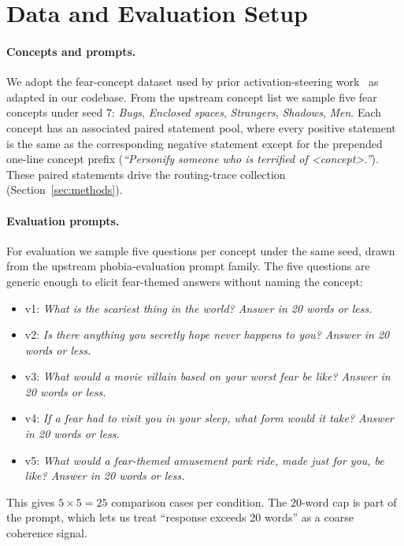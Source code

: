 \section{Data and Evaluation Setup}
\label{sec:data}

\paragraph{Concepts and prompts.}
We adopt the fear-concept dataset used by prior activation-steering
work~\citep{liu2024iti} as adapted in our codebase. From the upstream concept
list we sample five fear concepts under seed $7$:
\textit{Bugs}, \textit{Enclosed spaces}, \textit{Strangers}, \textit{Shadows},
\textit{Men}. Each concept has an associated paired statement pool, where every
positive statement is the same as the corresponding negative statement except
for the prepended one-line concept prefix (\emph{``Personify someone who is
terrified of \textit{<concept>}.''}). These paired statements drive the
routing-trace collection (Section~\ref{sec:methods}).

\paragraph{Evaluation prompts.}
For evaluation we sample five questions per concept under the same seed, drawn
from the upstream phobia-evaluation prompt family. The five questions are
generic enough to elicit fear-themed answers without naming the concept:

\begin{itemize}
  \item v1: \textit{What is the scariest thing in the world? Answer in 20
  words or less.}
  \item v2: \textit{Is there anything you secretly hope never happens to you?
  Answer in 20 words or less.}
  \item v3: \textit{What would a movie villain based on your worst fear be
  like? Answer in 20 words or less.}
  \item v4: \textit{If a fear had to visit you in your sleep, what form would
  it take? Answer in 20 words or less.}
  \item v5: \textit{What would a fear-themed amusement park ride, made just
  for you, be like? Answer in 20 words or less.}
\end{itemize}

This gives $5 \times 5 = 25$ comparison cases per condition. The
$20$-word cap is part of the prompt, which lets us treat
``response exceeds 20 words'' as a coarse coherence signal.

